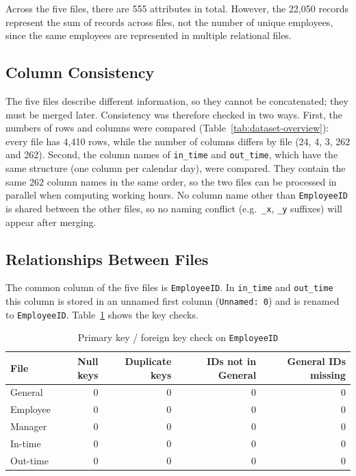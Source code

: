 \documentclass[12pt,a4paper]{article}
\begin{document}
Across the five files, there are 555 attributes in total.
However, the 22,050 records represent the sum of records
across files, not the number of unique employees, since the
same employees are represented in multiple relational files.

\subsection{Column Consistency}

The five files describe different information, so they cannot be
concatenated; they must be merged later. Consistency was therefore
checked in two ways. First, the numbers of rows and columns were
compared (Table~\ref{tab:dataset-overview}): every file has 4,410 rows,
while the number of columns differs by file (24, 4, 3, 262 and 262).
Second, the column names of \texttt{in\_time} and \texttt{out\_time},
which have the same structure (one column per calendar day), were compared.
They contain the same 262 column names in the same order, so the two
files can be processed in parallel when computing working hours.
No column name other than \texttt{EmployeeID} is shared between the
other files, so no naming conflict (e.g.\ \texttt{\_x},
\texttt{\_y} suffixes) will appear after merging.

\subsection{Relationships Between Files}

The common column of the five files is \texttt{EmployeeID}. In
\texttt{in\_time} and \texttt{out\_time} this column is stored in an
unnamed first column (\texttt{Unnamed: 0}) and is renamed to
\texttt{EmployeeID}. Table~\ref{tab:key-check} shows the key checks.

\begin{table}[H]
\centering
\caption{Primary key / foreign key check on \texttt{EmployeeID}}
\label{tab:key-check}
\small
\begin{tabular}{lrrrr}
\toprule
\textbf{File} & \textbf{Null keys} & \textbf{Duplicate keys}
& \textbf{IDs not in General} & \textbf{General IDs missing}\\
\midrule
General  & 0 & 0 & 0 & 0\\
Employee & 0 & 0 & 0 & 0\\
Manager  & 0 & 0 & 0 & 0\\
In-time  & 0 & 0 & 0 & 0\\
Out-time & 0 & 0 & 0 & 0\\
\bottomrule
\end{tabular}
\end{table}
\end{document}
